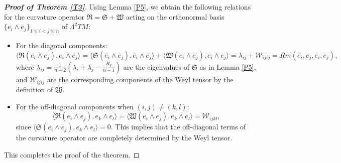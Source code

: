 \documentclass[12pt, twoside]{article}
\theoremstyle{definition}
\numberwithin{equation}{section}
\begin{document}
	\begin{proof}[\textbf{Proof of Theorem \ref{T3}}]
		
		Using Lemma \ref{P5}, we obtain the following relations for the curvature operator $\mathfrak{R}=\mathfrak{S}+\mathfrak{W}$ acting on the orthonormal basis $\{e_{i}\wedge e_{j}\}_{1\leq i<j\leq n}$ of $\Lambda^2 TM$:
		\begin{itemize}
			\item For the diagonal components:
			\begin{equation*}
			\langle \mathfrak{R}(e_i\wedge e_j), e_i\wedge e_j \rangle =\langle \mathfrak{S}(e_i\wedge e_j), e_i\wedge e_j \rangle+\langle \mathfrak{W}(e_i\wedge e_j), e_i\wedge e_j \rangle= \lambda_{ij} + \mathcal{W}_{ijij} = Rm(e_i,e_j,e_i,e_j),
			\end{equation*}
			where $\lambda_{ij} = \frac{1}{n-2}(\lambda_i + \lambda_j - \frac{R_g}{n-1})$ are the eigenvalues of $\mathfrak{S}$ as in Lemma \ref{P5}, and $\mathcal{W}_{ijij}$ are the corresponding components of the Weyl tensor by the definition of $\mathfrak{W}$.
			\item For the off-diagonal components when $(i,j) \neq (k,l)$:
			\begin{equation*}
			\langle \mathfrak{R}(e_i\wedge e_j), e_k\wedge e_l \rangle=\langle \mathfrak{W}(e_i\wedge e_j), e_k\wedge e_l \rangle = \mathcal{W}_{ijkl},
			\end{equation*}
			since $\langle \mathfrak{S}(e_i\wedge e_j), e_k\wedge e_l \rangle=0$. This implies that the off-diagonal terms of the curvature operator are completely determined by the Weyl tensor.	
		\end{itemize}
		This completes the proof of the theorem.	
	\end{proof}
	
\end{document}
